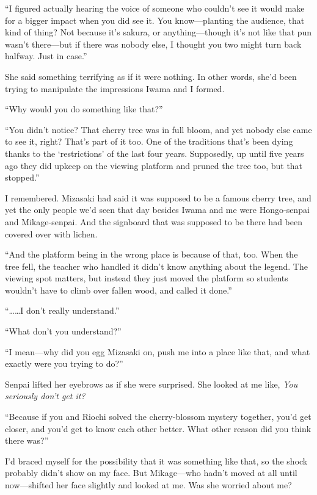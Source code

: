 \documentclass[
    a4paper,
    12pt,
    twoside,
    openany,
    UTF8,
    fontset=windows
]{ctexbook}
\begin{document}
``I figured actually hearing the voice of someone who couldn't see it would make for a bigger impact when you did see it. You know---planting the audience, that kind of thing? Not because it's sakura, or anything---though it's not like that pun wasn't there---but if there was nobody else, I thought you two might turn back halfway. Just in case.''

She said something terrifying as if it were nothing. In other words, she'd been trying to manipulate the impressions Iwama and I formed.

``Why would you do something like that?''

``You didn't notice? That cherry tree was in full bloom, and yet nobody else came to see it, right? That's part of it too. One of the traditions that's been dying thanks to the `restrictions' of the last four years. Supposedly, up until five years ago they did upkeep on the viewing platform and pruned the tree too, but that stopped.''

I remembered. Mizasaki had said it was supposed to be a famous cherry tree, and yet the only people we'd seen that day besides Iwama and me were Hongo-senpai and Mikage-senpai. And the signboard that was supposed to be there had been covered over with lichen.

``And the platform being in the wrong place is because of that, too. When the tree fell, the teacher who handled it didn't know anything about the legend. The viewing spot matters, but instead they just moved the platform so students wouldn't have to climb over fallen wood, and called it done.''

``\dots\dots I don't really understand.''

``What don't you understand?''

``I mean---why did you egg Mizasaki on, push me into a place like that, and what exactly were you trying to do?''

Senpai lifted her eyebrows as if she were surprised. She looked at me like, \textit{You seriously don't get it?}

``Because if you and Riochi solved the cherry-blossom mystery together, you'd get closer, and you'd get to know each other better. What other reason did you think there was?''

I'd braced myself for the possibility that it was something like that, so the shock probably didn't show on my face. But Mikage---who hadn't moved at all until now---shifted her face slightly and looked at me. Was she worried about me?
\end{document}
